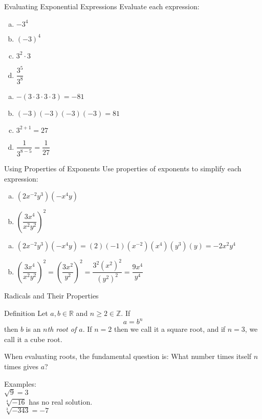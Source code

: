 \documentclass{beamer}
\def\R{\mathbb{R}} %
\def\Z{\mathbb{Z}} %
\newcommand{\fp}[1]{\left({#1}\right)} %
\begin{document}
\begin{frame}[t]{Evaluating Exponential Expressions}
Evaluate each expression: \begin{enumerate}[(a)]
\item $-3^4$
\item $(-3)^4$
\item $3^2\cdot 3$
\item $\dfrac{3^5}{3^8}$
\end{enumerate}

\pause
\begin{enumerate}[(a)]
\item $-(3\cdot 3\cdot 3\cdot 3) = -81$ \pause
\item $(-3)(-3)(-3)(-3) = 81$ \pause
\item $3^{2+1} = 27$ \pause
\item $\dfrac{1}{3^{8-5}} = \dfrac{1}{27}$
\end{enumerate}

\end{frame}

\begin{frame}[t]{Using Properties of Exponents}
Use properties of exponents to simplify each expression: \begin{enumerate}[(a)]
\item $\fp{2x^{-2}y^3}\fp{-x^4y}$
\item $\fp{\dfrac{3x^4}{x^2y^2}}^2$
\end{enumerate}

\vspace{12pt}

\pause
\begin{enumerate}[(a)]
\item $\fp{2x^{-2}y^3}\fp{-x^4y} = (2)(-1)(x^{-2})(x^4)(y^3)(y) = -2x^2y^4$ \pause
\item $\fp{\dfrac{3x^4}{x^2y^2}}^2 = \fp{\dfrac{3x^2}{y^2}}^2 = \dfrac{3^2(x^2)^2}{(y^2)^2} = \dfrac{9x^4}{y^4}$
\end{enumerate}

\end{frame}

\begin{frame}[t]{Radicals and Their Properties}
\begin{block}{Definition}
Let $a,b\in\R$ and $n\geq 2 \in \Z$. If $$a = b^n$$ then $b$ is an \textit{$n$th root of $a$}. If $n = 2$ then we call it a square root, and if $n =3$, we call it a cube root.
\end{block}

When evaluating roots, the fundamental question is: What number times itself $n$ times gives $a$?

\pause
Examples: \\
$\sqrt{9} = 3$ \\ \pause
$\sqrt[4]{-16}$ has no real solution. \\ \pause
$\sqrt[3]{-343} = -7$

\end{frame}
\end{document}

